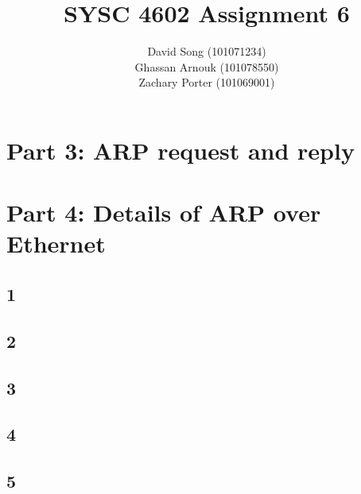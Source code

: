 \documentclass{article}
\begin{document}
    \title  { \textbf{SYSC 4602 Assignment 6} }
    \author {
        David Song (101071234)\\
        Ghassan Arnouk (101078550)\\
        Zachary Porter (101069001)
    }

    \maketitle

    \clearpage
    \section*{Part 3: ARP request and reply}
    \section*{Part 4: Details of ARP over Ethernet}
    \subsection*{1}
    \subsection*{2}
    \subsection*{3}
    \subsection*{4}
    \subsection*{5}
\end{document}
